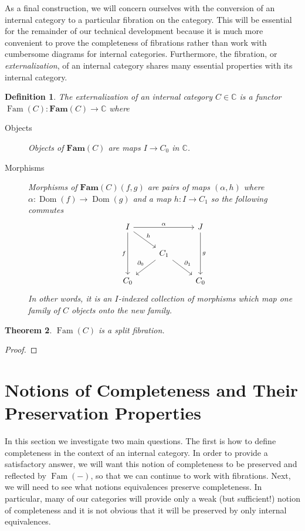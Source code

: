 \documentclass[12pt]{amsart}
\newcommand{\todo}[1]{{\color{red}{\LARGE #1}}}
\newcommand{\cat}[1]{\ensuremath{\mathbf{#1}}}
\newcommand{\Ccat}{\ensuremath{\mathbb{C}}}
\DeclareMathOperator{\dom}{Dom}
\DeclareMathOperator{\family}{Fam}
\newtheorem{thm}{Theorem}[section]
\newtheorem{defn}[thm]{Definition}
\begin{document}
As a final construction, we will concern ourselves with the conversion
of an internal category to a particular fibration on the
category. This will be essential for the remainder of our technical
development because it is much more convenient to prove the
completeness of fibrations rather than work with cumbersome diagrams
for internal categories. Furthermore, the fibration, or
\emph{externalization}, of an internal category shares many essential
properties with its internal category.
\begin{defn}\label{defn:internal:externalization}
  The \emph{externalization} of an internal category $C \in \Ccat$ is
  a functor $\family(C) : \cat{Fam}(C) \to \Ccat$ where
  \begin{description}
  \item[Objects] Objects of $\cat{Fam}(C)$ are maps $I \to C_0$ in
    $\Ccat$.
  \item[Morphisms] Morphisms of $\cat{Fam}(C)(f, g)$ are pairs of maps
    $(\alpha, h)$ where $\alpha : \dom(f) \to \dom(g)$ and a map $h :
    I \to C_1$ so the following commutes
    \[
      \begin{tikzcd}
        I \ar[dd, swap, "f"] \ar[rd, "h"] \ar[rr, "\alpha"] && J \ar[dd, "g"]\\
        & C_1 \ar[dl, swap, "\partial_0"] \ar[dr, "\partial_1"] &\\
        C_0 && C_0
      \end{tikzcd}
    \]
    In other words, it is an $I$-indexed collection of morphisms which
    map one family of $C$ objects onto the new family.
  \end{description}
\end{defn}

\begin{thm}\label{thm:internal:externalization}
  $\family(C)$ is a split fibration.
\end{thm}
\begin{proof}
  \todo{Should prove this in full}
\end{proof}

\section{Notions of Completeness and Their Preservation Properties}\label{sec:completeness}

In this section we investigate two main questions. The first is how to
define completeness in the context of an internal category. In order
to provide a satisfactory answer, we will want this notion of
completeness to be preserved and reflected by $\family(-)$, so that we
can continue to work with fibrations. Next, we will need to see what
notions equivalences preserve completeness. In particular, many of our
categories will provide only a weak (but sufficient!) notion of
completeness and it is not obvious that it will be preserved by only
internal equivalences.
\end{document}
